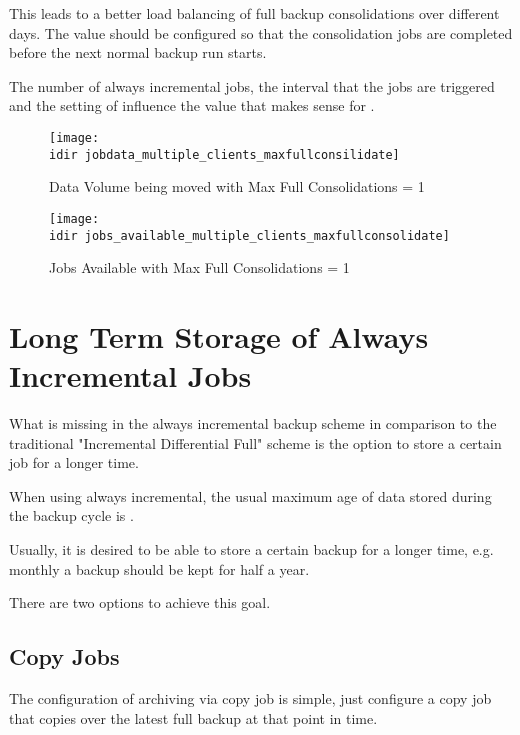 This leads to a better load balancing of full backup consolidations over different days. 
The value should be configured so that the consolidation jobs are completed before the next normal backup run starts.

The number of always incremental jobs, the interval that the jobs are triggered
and the setting of  influence the value
that makes sense for .

\begin{figure}[htbp]
\centering
\texttt{[image: \\idir jobdata\_multiple\_clients\_maxfullconsilidate]}
\caption{Data Volume being moved with Max Full Consolidations = 1}%
\end{figure}%

\begin{figure}[htbp]
\centering
\texttt{[image: \\idir jobs\_available\_multiple\_clients\_maxfullconsolidate]}
\caption{Jobs Available with Max Full Consolidations = 1}%
\end{figure}%


\section{Long Term Storage of Always Incremental Jobs}
\label{sec:AlwaysIncrementalLongTermStorage}

What is missing in the always incremental backup scheme in comparison to the traditional "Incremental Differential Full" scheme is the option to store a certain job for a longer time.

When using always incremental, the usual maximum age of data stored during the backup cycle is .

Usually, it is desired to be able to store a certain backup for a longer time, e.g. monthly a backup should be kept for half a year.

There are two options to achieve this goal.

\subsection{Copy Jobs}

The configuration of archiving via copy job is simple, just configure a copy job that copies over the latest full backup
at that point in time.

